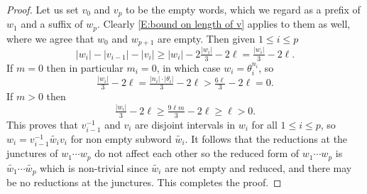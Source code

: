 \documentclass[12pt]{amsart}
\theoremstyle{definition}
\begin{document}
\begin{proof}
Let us set $v_0$ and $v_p$ to be the empty words, which we regard as a prefix of $w_1$ and a suffix of $w_p$.
Clearly \eqref{E:bound on length of v} applies to them as well, where we agree that $w_0$ and $w_{p+1}$ are empty.
Then given $1 \leq i \leq p$
\[
|w_i|-|v_{i-1}|-|v_i| \geq
|w_i| - 2 \tfrac{|w_i|}{3} - 2\ell =
\tfrac{|w_i|}{3} - 2\ell.
\]
If $m=0$ then in particular $m_i=0$, in which case $w_i=\theta_i^{n_i}$, so
\[
\tfrac{|w_i|}{3} - 2\ell  = \tfrac{|n_i| \cdot |\theta_i|}{3} - 2\ell > \tfrac{6\ell}{3}-2\ell =0.
\]
If $m>0$ then 
\[
\tfrac{|w_i|}{3} - 2\ell \geq \tfrac{9\ell m}{3}-2\ell \geq \ell >0.
\]
This proves that $v_{i-1}^{-1}$ and $v_i$ are disjoint intervals in $w_i$ for all $1 \leq i \leq p$, so $w_i=v_{i-1}^{-1}\widetilde{w_i}v_i$ for non empty subword $\widetilde{w_i}$.
It follows that the reductions at the junctures of $w_1 \cdots w_p$ do not affect each other so the reduced form of $w_1\cdots w_p$ is $\widetilde{w_1}\cdots \widetilde{w_p}$ which is non-trivial since $\widetilde{w_i}$ are not empty and reduced, and there may be no reductions at the junctures.
This completes the proof.
\end{proof}
\end{document}
